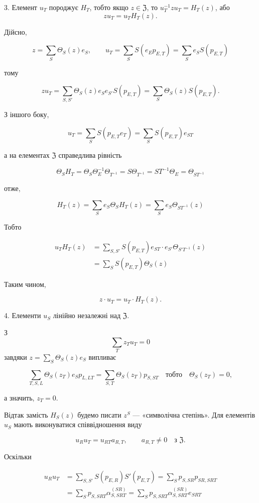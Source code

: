 \documentclass[11pt]{article}
\begin{document}
3. Елемент \(u_T\) породжує \(H_T\), тобто якщо \(z\in\mathfrak Z\), то \(u_T^{-1}zu_T=H_T(z)\), або
\[
z u_T=u_T H_T(z).
\]

Дійсно,

\[
z=\sum_S\Theta_S(z)e_S,\qquad
u_T=\sum_S S(e_Ep_{E,T})=\sum_S e_S S(p_{E,T})
\]

тому

\[
zu_T=\sum_{S,S'}\Theta_S(z)e_Se_{S'}S(p_{E,T})
=\sum_S\Theta_S(z)S(p_{E,T}).
\]

З іншого боку,

\[
u_T=\sum_S S(p_{E,T}e_T)=\sum_S S(p_{E,T})e_{ST}
\]

а на елементах \(\mathfrak Z\) справедлива рівність

\[
\Theta_S H_T=\Theta_S\Theta_E^{-1}\Theta_{T^{-1}}
=S\Theta_{T^{-1}}=ST^{-1}\Theta_E=\Theta_{ST^{-1}}
\]

отже,

\[
H_T(z)=\sum_S e_S\Theta_S H_T(z)=\sum_S e_S\Theta_{ST^{-1}}(z)
\]

Тобто

\[
\begin{aligned}
u_TH_T(z)
&=\sum_{S,S'} S(p_{E,T})e_{ST}\cdot e_{S'}\Theta_{S'T^{-1}}(z)\\
&=\sum_S S(p_{E,T})\Theta_S(z)
\end{aligned}
\]

Таким чином,

\[
z\cdot u_T=u_T\cdot H_T(z).
\]

4. Елементи \(u_S\) лінійно незалежні над \(\mathfrak Z\).

З
\[
\sum_T z_Tu_T=0
\]
завдяки \(z=\sum_S\Theta_S(z)e_S\) випливає

\[
\sum_{T,S,L}\Theta_S(z_T)e_Sp_{L,LT}
=\sum_{S,T}\Theta_S(z_T)p_{S,ST}\quad\text{тобто}\quad
\Theta_S(z_T)=0,
\]

а значить, \(z_T=0\).

Відтак замість \(H_S(z)\) будемо писати \(z^S\) --- «символічна степінь». Для елементів \(u_S\) мають виконуватися співвідношення виду

\[
u_Ru_T=u_{RT}a_{R,T},\qquad a_{R,T}\ne0\quad\text{з }\mathfrak Z.
\]

Оскільки

\[
\begin{aligned}
u_Ru_T
&=\sum_{S,S'} S(p_{E,R})S'(p_{E,T})
=\sum_S p_{S,SR}p_{SR,SRT}\\
&=\sum_S p_{S,SRT}\alpha_{S,SRT}^{(SR)}
=\sum_S p_{S,SRT}\alpha_{S,SRT}^{(SR)}e_{SRT}
\end{aligned}
\]
\end{document}
